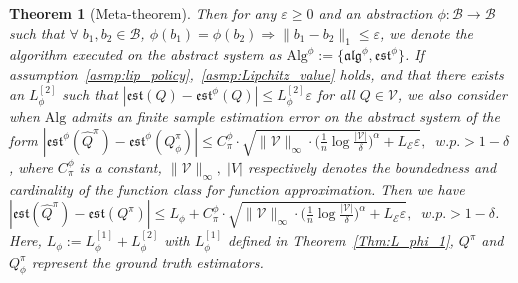 \documentclass[twoside]{article}
\newtheorem{theorem}{Theorem}
\newcommand{\CAL}[1]{\mathcal{#1}}
\newcommand{\yplu}[1]{{\color{orange}{ [\textbf{Yiping:}} #1]}}
\begin{document}
\begin{theorem}[Meta-theorem]
Then for any $\varepsilon\geq 0$ and an abstraction $\phi:\CAL{B}\to\CAL{B}$ such that $\forall\;b_1,b_2\in\CAL{B}$, $\phi(b_1)=\phi(b_2)\Rightarrow\|b_1-b_2\|_1\leq \varepsilon$, we denote the algorithm executed on the abstract system as $\mathrm{Alg}^\phi:=\{\mathfrak{alg}^\phi,\mathfrak{est}^\phi\}$. If assumption~\ref{asmp:lip_policy},~\ref{asmp:Lipchitz_value} holds, and that there exists an $L_\phi^{[2]}$ such that $|\mathfrak{est}(Q)-\mathfrak{est}^\phi(Q)|\leq L_\phi^{[2]}\varepsilon$ for all $Q\in\CAL{V}$, we also consider when $\mathrm{Alg}$ admits an finite sample estimation error on the abstract system of the form $|\mathfrak{est}^\phi(\hat{Q}^\pi)-\mathfrak{est}^\phi(Q_\phi^\pi)|\leq C_\pi^\phi\cdot\sqrt{\|\CAL{V}\|_\infty\cdot\bigg(\frac{1}{n}\log\frac{|\CAL{V}|}{\delta}\bigg)^\alpha+L_{\CAL{E}}\varepsilon},\;\; w.p.>1-\delta$,
where $C_\pi^\phi$ is a constant, $\|\CAL{V}\|_\infty,\; |V|$ respectively denotes the boundedness and cardinality of the function class for function approximation. Then we have $|\mathfrak{est}(\hat{Q}^\pi)-\mathfrak{est}(Q^\pi)|\leq L_\phi+C_\pi^\phi\cdot\sqrt{\|\CAL{V}\|_\infty\cdot\bigg(\frac{1}{n}\log\frac{|\CAL{V}|}{\delta}\bigg)^\alpha+L_{\CAL{E}}\varepsilon},\;\; w.p.>1-\delta$.
Here, $L_\phi:=L_\phi^{[1]}+L_\phi^{[2]}$ with $L_\phi^{[1]}$ defined in Theorem~\ref{Thm:L_phi_1}, $Q^\pi$ and $Q_\phi^\pi$ represent the ground truth estimators.
\end{theorem}





\end{document}
